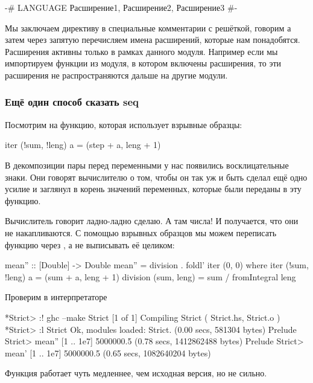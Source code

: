 \begin{code}
{-# LANGUAGE 
        Расширение1, 
        Расширение2, 
        Расширение3 #-}
\end{code}

Мы заключаем директиву в специальные комментарии с решёткой,
говорим  а затем через запятую перечисляем
имена расширений, которые нам понадобятся. Расширения активны 
только в рамках данного модуля. Например если мы импортируем
функции из модуля, в котором включены расширения, то эти
расширения не распространяются дальше на другие модули. 

\subsubsection{Ещё один способ сказать seq}

Посмотрим на функцию, которая использует взрывные образцы:

\begin{code}
iter (!sum, !leng) a = (step + a, leng + 1)
\end{code}

В декомпозиции пары перед переменными у нас появились 
восклицательные знаки. Они говорят вычислителю о том, 
чтобы он так уж и быть сделал ещё одно усилие и заглянул в корень
значений переменных, которые были переданы в эту функцию. 

Вычислитель говорит ладно-ладно сделаю. А там числа! И
получается, что они не накапливаются. С помощью
взрывных образцов мы можем переписать функцию  
через , а не выписывать её целиком:

\begin{code}
mean'' :: [Double] -> Double
mean'' = division . foldl' iter (0, 0)
    where iter (!sum, !leng) a = (sum  + a, leng + 1)
          division (sum, leng) = sum / fromIntegral leng
\end{code}

Проверим в интерпретаторе

\begin{code}
*Strict> :! ghc --make Strict
[1 of 1] Compiling Strict           ( Strict.hs, Strict.o )
*Strict> :l Strict
Ok, modules loaded: Strict.
(0.00 secs, 581304 bytes)
Prelude Strict> mean'' [1 .. 1e7]
5000000.5
(0.78 secs, 1412862488 bytes)
Prelude Strict> mean' [1 .. 1e7]
5000000.5
(0.65 secs, 1082640204 bytes)
\end{code}

Функция работает чуть медленнее, чем исходная версия, но не
сильно.

